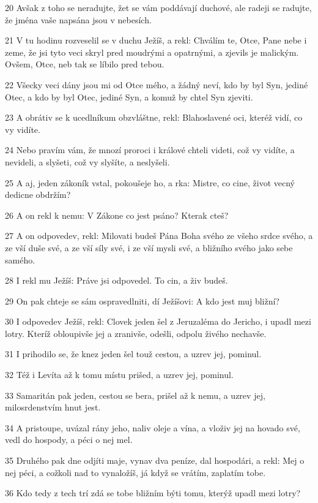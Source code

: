 \par 20 Avšak z toho se neradujte, žet se vám poddávají duchové, ale radeji se radujte, že jména vaše napsána jsou v nebesích.
\par 21 V tu hodinu rozveselil se v duchu Ježíš, a rekl: Chválím te, Otce, Pane nebe i zeme, že jsi tyto veci skryl pred moudrými a opatrnými, a zjevils je malickým. Ovšem, Otce, neb tak se líbilo pred tebou.
\par 22 Všecky veci dány jsou mi od Otce mého, a žádný neví, kdo by byl Syn, jediné Otec, a kdo by byl Otec, jediné Syn, a komuž by chtel Syn zjeviti.
\par 23 A obrátiv se k ucedlníkum obzvláštne, rekl: Blahoslavené oci, kteréž vidí, co vy vidíte.
\par 24 Nebo pravím vám, že mnozí proroci i králové chteli videti, což vy vidíte, a nevideli, a slyšeti, což vy slyšíte, a neslyšeli.
\par 25 A aj, jeden zákoník vstal, pokoušeje ho, a rka: Mistre, co cine, život vecný dedicne obdržím?
\par 26 A on rekl k nemu: V Zákone co jest psáno? Kterak cteš?
\par 27 A on odpovedev, rekl: Milovati budeš Pána Boha svého ze všeho srdce svého, a ze vší duše své, a ze vší síly své, i ze vší mysli své, a bližního svého jako sebe samého.
\par 28 I rekl mu Ježíš: Práve jsi odpovedel. To cin, a živ budeš.
\par 29 On pak chteje se sám ospravedlniti, dí Ježíšovi: A kdo jest muj bližní?
\par 30 I odpovedev Ježíš, rekl: Clovek jeden šel z Jeruzaléma do Jericho, i upadl mezi lotry. Kteríž obloupivše jej a zranivše, odešli, odpolu živého nechavše.
\par 31 I prihodilo se, že knez jeden šel touž cestou, a uzrev jej, pominul.
\par 32 Též i Levíta až k tomu místu prišed, a uzrev jej, pominul.
\par 33 Samaritán pak jeden, cestou se bera, prišel až k nemu, a uzrev jej, milosrdenstvím hnut jest.
\par 34 A pristoupe, uvázal rány jeho, naliv oleje a vína, a vloživ jej na hovado své, vedl do hospody, a péci o nej mel.
\par 35 Druhého pak dne odjíti maje, vynav dva peníze, dal hospodári, a rekl: Mej o nej péci, a cožkoli nad to vynaložíš, já když se vrátím, zaplatím tobe.
\par 36 Kdo tedy z tech trí zdá se tobe bližním býti tomu, kterýž upadl mezi lotry?
